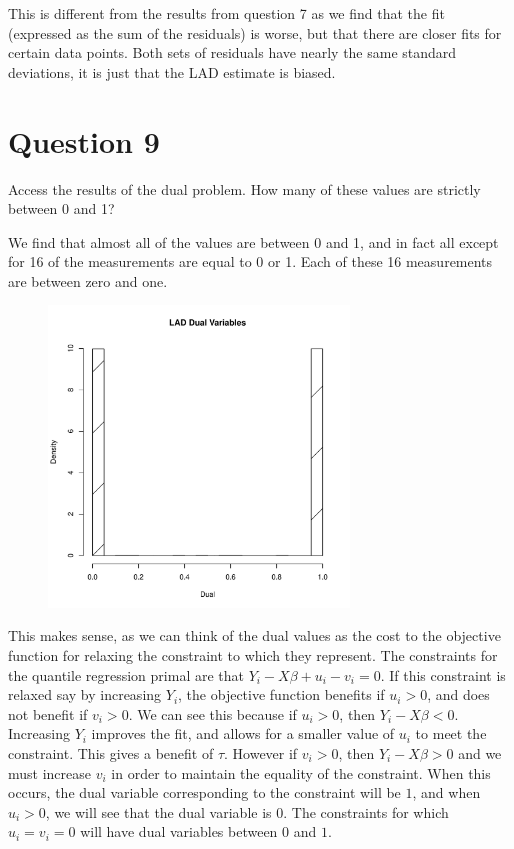 \documentclass[12pt]{paper}
\begin{document}
This is different from the results from question 7 as we find that
the fit (expressed as the sum of the residuals) is worse, but that
there are closer fits for certain data points. Both sets of residuals
have nearly the same standard deviations, it is just that the LAD
estimate is biased.

\section*{Question 9}

Access the results of the dual problem. How many of these values are
strictly between 0 and 1?

\vspace{.3in}

We find that almost all of the values are between 0 and 1, and in fact all
except for 16 of the measurements are equal to 0 or 1. Each of these
16 measurements are between zero and one.

\begin{figure}[H]
  \centering
  \includegraphics[width=8cm]{qNineHist.pdf}
\end{figure}

This makes sense, as we can think of the dual values as the cost to
the objective function for relaxing the constraint to which they
represent. The constraints for the quantile regression primal are that
$Y_i - X\beta + u_i - v_i = 0$. If this constraint is relaxed say by
increasing $Y_i$, the objective function benefits if $u_i > 0$, and
does not benefit if $v_i > 0$. We can see this because if $u_i > 0$,
then $Y_i - X\beta < 0$. Increasing $Y_i$ improves the fit, and allows for
a smaller value of $u_i$ to meet the constraint. This gives a benefit
of $\tau$. However if $v_i > 0$, then $Y_i - X\beta > 0$ and we must increase
$v_i$ in order to maintain the equality of the constraint. When this
occurs, the dual variable corresponding to the constraint will be $1$,
and when $u_i > 0$, we will see that the dual variable is $0$. The
constraints for which $u_i = v_i = 0$ will have dual variables between
$0$ and $1$.
\end{document}
